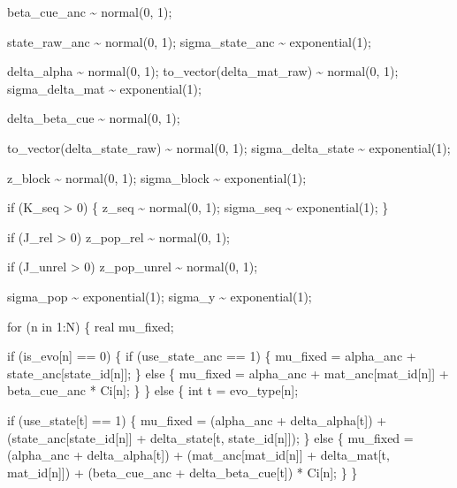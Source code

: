 \documentclass[
]{article}
\newenvironment{Shaded}{\begin{snugshade}}{\end{snugshade}}
\newcommand{\StringTok}[1]{\textcolor[rgb]{0.31,0.60,0.02}{#1}}
\begin{document}
\begin{Shaded}
\begin{Highlighting}[]
\StringTok{  beta\_cue\_anc \textasciitilde{} normal(0, 1);}

\StringTok{  state\_raw\_anc \textasciitilde{} normal(0, 1);}
\StringTok{  sigma\_state\_anc \textasciitilde{} exponential(1);}

\StringTok{  delta\_alpha \textasciitilde{} normal(0, 1);}
\StringTok{  to\_vector(delta\_mat\_raw) \textasciitilde{} normal(0, 1);}
\StringTok{  sigma\_delta\_mat \textasciitilde{} exponential(1);}

\StringTok{  delta\_beta\_cue \textasciitilde{} normal(0, 1);}

\StringTok{  to\_vector(delta\_state\_raw) \textasciitilde{} normal(0, 1);}
\StringTok{  sigma\_delta\_state \textasciitilde{} exponential(1);}

\StringTok{  z\_block \textasciitilde{} normal(0, 1);}
\StringTok{  sigma\_block \textasciitilde{} exponential(1);}

\StringTok{  if (K\_seq \textgreater{} 0) \{}
\StringTok{    z\_seq \textasciitilde{} normal(0, 1);}
\StringTok{    sigma\_seq \textasciitilde{} exponential(1);}
\StringTok{  \}}

\StringTok{  if (J\_rel \textgreater{} 0)}
\StringTok{    z\_pop\_rel \textasciitilde{} normal(0, 1);}

\StringTok{  if (J\_unrel \textgreater{} 0)}
\StringTok{    z\_pop\_unrel \textasciitilde{} normal(0, 1);}

\StringTok{  sigma\_pop \textasciitilde{} exponential(1);}
\StringTok{  sigma\_y \textasciitilde{} exponential(1);}

\StringTok{  for (n in 1:N) \{}
\StringTok{    real mu\_fixed;}

\StringTok{    if (is\_evo[n] == 0) \{}
\StringTok{      if (use\_state\_anc == 1) \{}
\StringTok{        mu\_fixed = alpha\_anc + state\_anc[state\_id[n]];}
\StringTok{      \} else \{}
\StringTok{        mu\_fixed = alpha\_anc}
\StringTok{                 + mat\_anc[mat\_id[n]]}
\StringTok{                 + beta\_cue\_anc * Ci[n];}
\StringTok{      \}}
\StringTok{    \} else \{}
\StringTok{      int t = evo\_type[n];}

\StringTok{      if (use\_state[t] == 1) \{}
\StringTok{        mu\_fixed = (alpha\_anc + delta\_alpha[t])}
\StringTok{                 + (state\_anc[state\_id[n]] + delta\_state[t, state\_id[n]]);}
\StringTok{      \} else \{}
\StringTok{        mu\_fixed = (alpha\_anc + delta\_alpha[t])}
\StringTok{                 + (mat\_anc[mat\_id[n]] + delta\_mat[t, mat\_id[n]])}
\StringTok{                 + (beta\_cue\_anc + delta\_beta\_cue[t]) * Ci[n];}
\StringTok{      \}}
\StringTok{    \}}


\end{Highlighting}
\end{Shaded}
\end{document}
